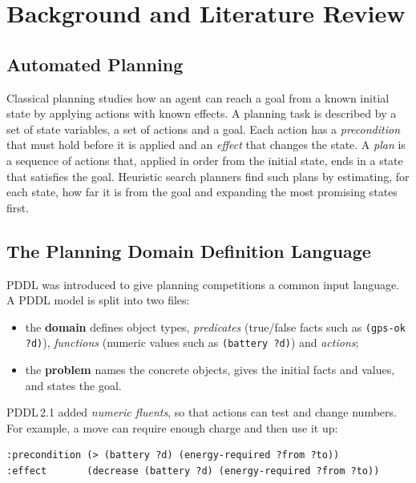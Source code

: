 \documentclass[11pt,a4paper,oneside]{report}
\newcommand{\code}[1]{\texttt{#1}}
\begin{document}
\chapter{Background and Literature Review}\label{ch:background}

\section{Automated Planning}
Classical planning studies how an agent can reach a goal from a known initial state by applying
actions with known effects. A planning task is described by a set of state variables, a set of
actions and a goal. Each action has a \emph{precondition} that must hold before it is applied
and an \emph{effect} that changes the state. A \emph{plan} is a sequence of actions that, applied
in order from the initial state, ends in a state that satisfies the goal. Heuristic search
planners find such plans by estimating, for each state, how far it is from the goal and
expanding the most promising states first.

\section{The Planning Domain Definition Language}
PDDL was introduced to give planning competitions a common input language. A PDDL model is
split into two files:
\begin{itemize}
  \item the \textbf{domain} defines object types, \emph{predicates} (true/false facts such as
        \code{(gps-ok ?d)}), \emph{functions} (numeric values such as \code{(battery ?d)}) and
        \emph{actions};
  \item the \textbf{problem} names the concrete objects, gives the initial facts and values, and
        states the goal.
\end{itemize}

\noindent PDDL\,2.1 added \emph{numeric fluents}, so that actions can test and change numbers.
For example, a move can require enough charge and then use it up:

\begin{lstlisting}
:precondition (> (battery ?d) (energy-required ?from ?to))
:effect       (decrease (battery ?d) (energy-required ?from ?to))
\end{lstlisting}
\end{document}
